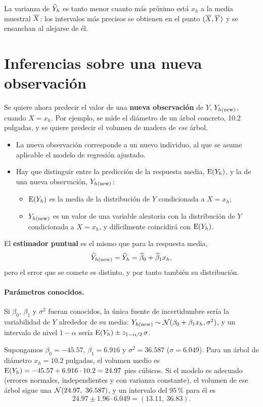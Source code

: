 La varianza de $\widehat{Y}_h$ es tanto menor cuanto más próximo está $x_h$ a la media muestral
$\overline{X}$: los intervalos más precisos se obtienen en el punto $(\overline{X},\overline{Y})$ y se
ensanchan al alejarse de él.

\section{Inferencias sobre una nueva observación}
\label{sec:t3-prediccion}

Se quiere ahora predecir el valor de una \textbf{nueva observación} de $Y$, $Y_{h(\mathrm{new})}$, cuando
$X=x_h$. Por ejemplo, se mide el diámetro de un árbol concreto, 10.2 pulgadas, y se quiere
predecir el volumen de madera de \emph{ese} árbol.

\begin{itemize}
  \item La nueva observación corresponde a un nuevo individuo, al que se asume aplicable el
    modelo de regresión ajustado.
  \item Hay que distinguir entre la predicción de la respuesta media, $\operatorname{E}(Y_h)$, y la de una
    nueva observación, $Y_{h(\mathrm{new})}$:
    \begin{itemize}
      \item $\operatorname{E}(Y_h)$ es la media de la distribución de $Y$ condicionada a $X=x_h$;
      \item $Y_{h(\mathrm{new})}$ es un valor de una variable aleatoria con la distribución de $Y$
        condicionada a $X=x_h$, y difícilmente coincidirá con $\operatorname{E}(Y_h)$.
    \end{itemize}
\end{itemize}
El \textbf{estimador puntual} es el mismo que para la respuesta media,
\[
  \widehat{Y}_{h(\mathrm{new})} = \widehat{Y}_h = \widehat{\beta}_0 + \widehat{\beta}_1x_h ,
\]
pero el error que se comete es distinto, y por tanto también su distribución.

\paragraph{Parámetros conocidos.} Si $\beta_0$, $\beta_1$ y $\sigma^2$ fueran conocidos, la única
fuente de incertidumbre sería la variabilidad de $Y$ alrededor de su media:
$Y_{h(\mathrm{new})}\sim\mathcal{N}(\beta_0+\beta_1x_h,\sigma^2)$, y un intervalo de nivel $1-\alpha$ sería
$\operatorname{E}(Y_h)\pm z_{1-\alpha/2}\,\sigma$.

\begin{ejemplo}
  Supongamos $\beta_0=-45.57$, $\beta_1=6.916$ y $\sigma^2=36.587$ ($\sigma=6.049$).
  Para un árbol
  de diámetro $x_h=10.2$ pulgadas, el volumen medio es
  $\operatorname{E}(Y_h)=-45.57+6.916\cdot10.2=24.97$ pies cúbicos. Si el modelo es adecuado (errores normales,
  independientes y con varianza constante), el volumen de ese árbol sigue una
  $\mathcal{N}(24.97,\ 36.587)$, y un intervalo del 95\,\% para él es
  \[
    24.97 \pm 1.96\cdot6.049 = (13.11,\ 36.83).
  \]
\end{ejemplo}

